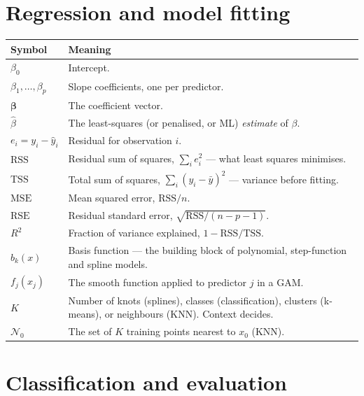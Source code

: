 \documentclass[10pt,letterpaper,onecolumn]{article}
\makeatletter
\newenvironment{symtab}
  {\begin{longtable}{@{}>{\raggedright\arraybackslash}p{0.26\textwidth}%
                       >{\raggedright\arraybackslash}p{0.70\textwidth}@{}}
   \toprule
   \textbf{Symbol} & \textbf{Meaning} \\
   \midrule
   \endhead
   \bottomrule
   \endfoot}
  {\end{longtable}}
\makeatother
\begin{document}
\section{Regression and model fitting}

\begin{symtab}
$\beta_0$ & Intercept. \\
$\beta_1,\dots,\beta_p$ & Slope coefficients, one per predictor. \\
$\boldsymbol\beta$ & The coefficient vector. \\
$\hat\beta$ & The least-squares (or penalised, or ML) \emph{estimate} of $\beta$. \\
$e_i = y_i - \hat y_i$ & Residual for observation $i$. \\
$\mathrm{RSS}$ & Residual sum of squares, $\sum_i e_i^2$ — what least squares minimises. \\
$\mathrm{TSS}$ & Total sum of squares, $\sum_i (y_i - \bar y)^2$ — variance before fitting. \\
$\mathrm{MSE}$ & Mean squared error, $\mathrm{RSS}/n$. \\
$\mathrm{RSE}$ & Residual standard error, $\sqrt{\mathrm{RSS}/(n-p-1)}$. \\
$R^2$ & Fraction of variance explained, $1 - \mathrm{RSS}/\mathrm{TSS}$. \\
$b_k(x)$ & Basis function — the building block of polynomial, step-function and spline models. \\
$f_j(x_j)$ & The smooth function applied to predictor $j$ in a GAM. \\
$K$ & Number of knots (splines), classes (classification), clusters (k-means), or neighbours (KNN). Context decides. \\
$\mathcal{N}_0$ & The set of $K$ training points nearest to $x_0$ (KNN). \\
\end{symtab}

\section{Classification and evaluation}
\end{document}
